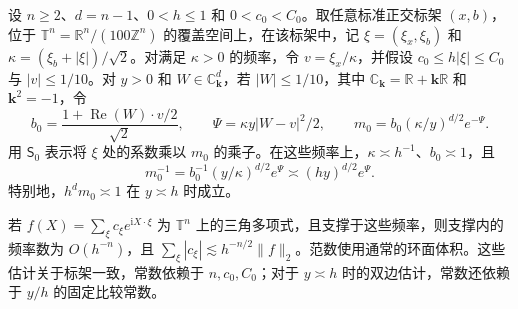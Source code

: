 设 $n\ge2$、$d=n-1$、$0<h\le1$ 和 $0<c_0<C_0$。取任意标准正交标架 $(x,b)$，位于 $\mathbb T^n=\mathbb R^n/(100\mathbb Z^n)$ 的覆盖空间上，在该标架中，记 $\xi=(\xi_x,\xi_b)$ 和 $\kappa=(\xi_b+|\xi|)/\sqrt2$。对满足 $\kappa>0$ 的频率，令 $v=\xi_x/\kappa$，并假设 $c_0\le h|\xi|\le C_0$ 与 $|v|\le1/10$。对 $y>0$ 和 $W\in\mathbb C_{\mathbf k}^d$，若 $|W|\le1/10$，其中 $\mathbb C_{\mathbf k}=\mathbb R+\mathbf k\mathbb R$ 和 $\mathbf k^2=-1$，令
\[
 b_0=\frac{1+\operatorname{Re}(W)\cdot v/2}{\sqrt2},\qquad
 \Psi=\kappa y|W-v|^2/2,\qquad
 m_0=b_0(\kappa/y)^{d/2}e^{-\Psi}.
\]
用 $\mathsf S_0$ 表示将 $\xi$ 处的系数乘以 $m_0$ 的乘子。在这些频率上，$\kappa\asymp h^{-1}$、$b_0\asymp1$，且
\[
 m_0^{-1}=b_0^{-1}(y/\kappa)^{d/2}e^\Psi
     \asymp(hy)^{d/2}e^\Psi .
\]
特别地，$h^d m_0\asymp1$ 在 $y\asymp h$ 时成立。

若 $f(X)=\sum_\xi c_\xi e^{\mathrm i X\cdot\xi}$ 为 $\mathbb T^n$ 上的三角多项式，且支撑于这些频率，则支撑内的频率数为 $O(h^{-n})$，且 $\sum_\xi|c_\xi|\lesssim h^{-n/2}\|f\|_2$。范数使用通常的环面体积。这些估计关于标架一致，常数依赖于 $n,c_0,C_0$；对于 $y\asymp h$ 时的双边估计，常数还依赖于 $y/h$ 的固定比较常数。
